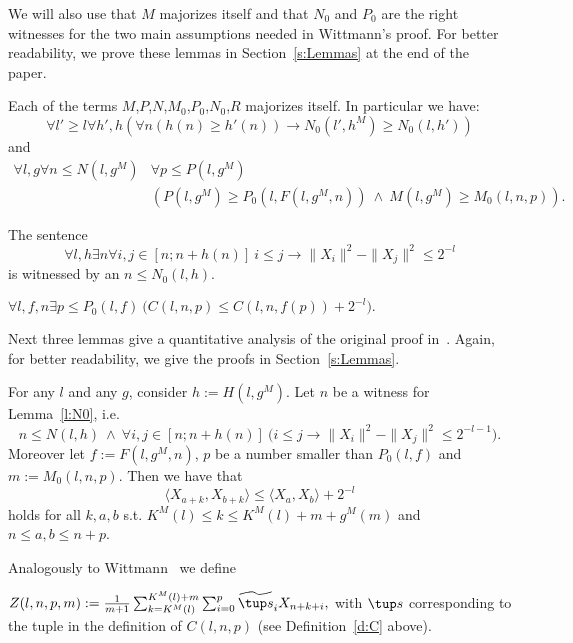 We will also use that $M$ majorizes itself and that $N_0$ and $P_0$ are the right witnesses for the two main assumptions needed in Wittmann's proof. For better readability, we prove these lemmas in Section~\ref{s:Lemmas} at the end of the paper.

\begin{lemma}[$M$ is a majorant]\label{l:M}
Each of the terms $M$,$P$,$N$,$M_0$,$P_0$,$N_0$,$R$ majorizes itself.
In particular we have:
\[ \forall l'\geq l\forall h',h ( \forall n (h(n)\geq h'(n)) \rightarrow N_0(l',h^M)\geq N_0(l,h') ) \]
and
\begin{align*}
 \forall l,g \forall n\leq N(l,g^M) &\forall p\leq P(l,g^M)\\
  &( P(l,g^M)\geq P_0(l,F(l,g^M,n))\ \wedge\ M(l,g^M)\geq M_0(l,n,p) ) . 
\end{align*}
\end{lemma}

\begin{lemma}[$N_0$ is correct]\label{l:N0}
The sentence
\[
\forall l,h \exists n \forall i,j\in[n;n+h(n)]\ i\leq j\rightarrow \|X_i\|^2-\|X_j\|^2\leq 2^{-l}
\]
is witnessed by an $n\leq N_0(l,h)$.
\end{lemma}

\begin{lemma}[$P_0$ is correct]\label{l:P0}
$
\forall l,f,n\exists p\leq P_0(l,f)\ \big( C(l,n,p)\leq C(l,n,f(p)) + 2^{-l} \big).
$
\end{lemma}

Next three lemmas give a quantitative analysis of the original proof in~\cite{Wittmann90}. Again, for better readability, we 
give the proofs in Section~\ref{s:Lemmas}. 

\begin{lemma}\label{l:scpb}
For any $l$ and any $g$, consider $h:= H(l,g^M)$. Let
$n$ be a witness for Lemma~\ref{l:N0}, i.e. 
\[
n\leq N(l,h)\ \wedge\ \forall i,j\in[n;n+h(n)]\ 
\big( i\leq j\rightarrow \|X_i\|^2-\|X_j\|^2\leq 2^{-l-1} \big) . \tag{N}
\]
Moreover let $f:=F(l,g^M,n)$,
$p$ be a number smaller than $P_0(l,f)$ 
and  $m:=M_0(l,n,p)$. Then we have that
\[ 
\langle X_{a+k},X_{b+k} \rangle \leq \langle X_{a},X_{b} \rangle + 2^{-l}
\]
holds for all $k,a,b$ s.t. $K^M(l)\leq k \leq K^M(l)+m+g^M(m)$ and $ n\leq a,b \leq n+p$.
\end{lemma}

Analogously to Wittmann~\cite{Wittmann90} we define
\begin{dfn}[$Z$]\label{d:Z}
$Z(l,n,p,m):=\frac{1}{m+1}\sum^{K^M(l)+m}_{k=K^M(l)}\sum^{p}_{i=0}  \widetilde{\tup s}_i X_{n+k+i},$
with $\tup s$ corresponding to the tuple in the definition of $C(l,n,p)$ (see
Definition~\ref{d:C} above). 
\end{dfn}

